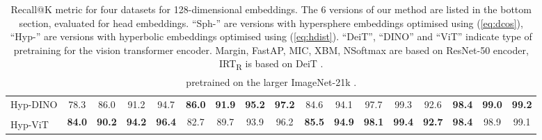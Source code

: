 \documentclass[10pt,twocolumn,letterpaper]{article}
\begin{document}
\begin{table*}
\begin{tabular}{l|cccc|cccc|cccc|cccc}
    Hyp-DINO &
    78.3 & 86.0 & 91.2 & 94.7 &
    {\bf 86.0} & {\bf 91.9} & {\bf 95.2} & {\bf 97.2} &
    84.6 & 94.1 & 97.7 & 99.3 &
    92.6 & {\bf 98.4} & {\bf 99.0} & {\bf 99.2} \\
    Hyp-ViT \textsuperscript{} &
    {\bf 84.0} & {\bf 90.2} & {\bf 94.2} & {\bf 96.4} &
    82.7 & 89.7 & 93.9 & 96.2 &
    {\bf 85.5} & {\bf 94.9} & {\bf 98.1} & {\bf 99.4} &
    {\bf 92.7} & {\bf 98.4} & 98.9 & 99.1 \\
    \bottomrule
  \end{tabular}
  \caption{Recall@K metric for four datasets for 128-dimensional embeddings. The 6 versions of our method are listed in the bottom section, evaluated for head embeddings. \mbox{``Sph-''} are versions with hypersphere embeddings optimised using  (\cref{eq:dcos}), ``Hyp-'' are versions with hyperbolic embeddings optimised using  (\cref{eq:hdist}). ``DeiT'', ``DINO'' and ``ViT'' indicate type of pretraining for the vision transformer encoder. Margin, FastAP, MIC, XBM, NSoftmax are based on ResNet-50 \cite{resnet} encoder, IRT\textsubscript{R} is based on DeiT \cite{deit}.\\
  \textsuperscript{} pretrained on the larger ImageNet-21k \cite{imagenet}.
  }
  \label{tab:exp_128}
\end{table*}
\end{document}

